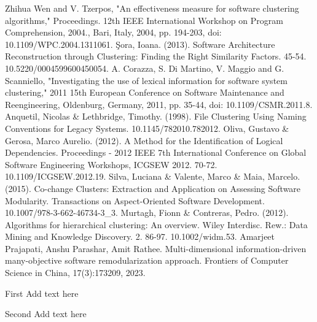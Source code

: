 \documentclass{ieeeaccess}
\begin{document}
\begin{thebibliography}{00}
 Zhihua Wen and V. Tzerpos, "An effectiveness measure for software clustering algorithms," Proceedings. 12th IEEE International Workshop on Program Comprehension, 2004., Bari, Italy, 2004, pp. 194-203, doi: 10.1109/WPC.2004.1311061.
 Şora, Ioana. (2013). Software Architecture Reconstruction through Clustering: Finding the Right Similarity Factors. 45-54. 10.5220/0004599600450054. 
 A. Corazza, S. Di Martino, V. Maggio and G. Scanniello, "Investigating the use of lexical information for software system clustering," 2011 15th European Conference on Software Maintenance and Reengineering, Oldenburg, Germany, 2011, pp. 35-44, doi: 10.1109/CSMR.2011.8.
 Anquetil, Nicolas \& Lethbridge, Timothy. (1998). File Clustering Using Naming Conventions for Legacy Systems. 10.1145/782010.782012. 
 Oliva, Gustavo \& Gerosa, Marco Aurelio. (2012). A Method for the Identification of Logical Dependencies. Proceedings - 2012 IEEE 7th International Conference on Global Software Engineering Workshops, ICGSEW 2012. 70-72. 10.1109/ICGSEW.2012.19. 
 Silva, Luciana \& Valente, Marco \& Maia, Marcelo. (2015). Co-change Clusters: Extraction and Application on Assessing Software Modularity. Transactions on Aspect-Oriented Software Development. 10.1007/978-3-662-46734-3\_3. 
 Murtagh, Fionn \& Contreras, Pedro. (2012). Algorithms for hierarchical clustering: An overview. Wiley Interdisc. Rew.: Data Mining and Knowledge Discovery. 2. 86-97. 10.1002/widm.53. 
 Amarjeet Prajapati, Anshu Parashar, Amit Rathee. Multi-dimensional information-driven many-objective software remodularization approach. Frontiers of Computer Science in China, 17(3):173209, 2023.


\end{thebibliography}

\begin{IEEEbiographynophoto}{First} Add text here
\end{IEEEbiographynophoto}

\begin{IEEEbiographynophoto}{Second} Add text here
\end{IEEEbiographynophoto}

\EOD
\end{document}
